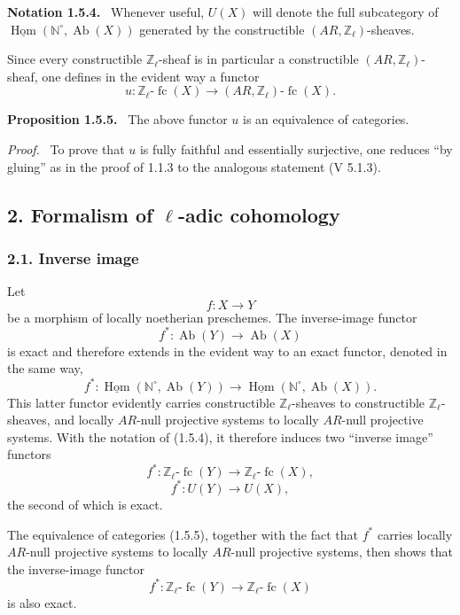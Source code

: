 \documentclass[11pt]{article}
\providecommand{\uHom}{\underline{\Hom}}
\newenvironment{statement}[1]{\par\medskip\noindent\textbf{#1.}\ }{\par\medskip}
\newenvironment{prooftext}[1][Proof]{\par\noindent\emph{#1.}\ }{\par\medskip}
\DeclareMathOperator{\Hom}{Hom}
\providecommand{\Hom}{\operatorname{Hom}}
\providecommand{\Ab}{\operatorname{Ab}}
\providecommand{\fc}{\operatorname{fc}}
\providecommand{\Ab}{\operatorname{Ab}}
\providecommand{\Hom}{\operatorname{Hom}}
\begin{document}
\begin{statement}{Notation 1.5.4}
Whenever useful, \(U(X)\) will denote the full subcategory of \(\uHom(\mathbb N^\circ,\Ab(X))\) generated by the constructible \((AR,\mathbb Z_\ell)\)-sheaves.
\end{statement}

Since every constructible \(\mathbb Z_\ell\)-sheaf is in particular a constructible \((AR,\mathbb Z_\ell)\)-sheaf, one defines in the evident way a functor
\[
u:\mathbb Z_\ell\text{-}\fc(X)\longrightarrow (AR,\mathbb Z_\ell)\text{-}\fc(X).
\]

\begin{statement}{Proposition 1.5.5}
The above functor \(u\) is an equivalence of categories.
\end{statement}

\begin{prooftext}[Proof]
To prove that \(u\) is fully faithful and essentially surjective, one reduces ``by gluing'' as in the proof of 1.1.3 to the analogous statement (V 5.1.3).
\end{prooftext}

\subsection*{2. Formalism of \(\ell\)-adic cohomology}

\subsubsection*{2.1. Inverse image}

Let
\[
f:X\longrightarrow Y
\]
be a morphism of locally noetherian preschemes. The inverse-image functor
\[
f^*:\Ab(Y)\longrightarrow \Ab(X)
\]
is exact and therefore extends in the evident way to an exact functor, denoted in the same way,
\[
f^*:\uHom(\mathbb N^\circ,\Ab(Y))\longrightarrow \uHom(\mathbb N^\circ,\Ab(X)).
\]
This latter functor evidently carries constructible \(\mathbb Z_\ell\)-sheaves to constructible \(\mathbb Z_\ell\)-sheaves, and locally \(AR\)-null projective systems to locally \(AR\)-null projective systems. With the notation of (1.5.4), it therefore induces two ``inverse image'' functors
\[
f^*:\mathbb Z_\ell\text{-}\fc(Y)\longrightarrow \mathbb Z_\ell\text{-}\fc(X),
\]
\[
f^*:U(Y)\longrightarrow U(X),
\]
the second of which is exact.

The equivalence of categories (1.5.5), together with the fact that \(f^*\) carries locally \(AR\)-null projective systems to locally \(AR\)-null projective systems, then shows that the inverse-image functor
\[
f^*:\mathbb Z_\ell\text{-}\fc(Y)\longrightarrow \mathbb Z_\ell\text{-}\fc(X)
\]
is also exact.
\end{document}
